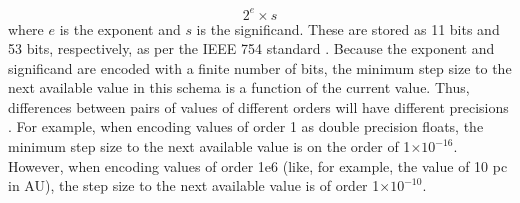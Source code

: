 \begin{equation}
2^e\times s
\end{equation}
where $e$ is the exponent and $s$ is the significand.  These are stored as 11 bits and 53 bits, respectively, as per the IEEE 754 standard \citep{IEEE2008}.  Because the exponent and significand are encoded with a finite number of bits, the minimum step size to the next available value in this schema is a function of the  current value.  Thus, differences between pairs of values of different orders will have different precisions \citep{moler2004numerical}.  For example, when encoding values of order 1 as double precision floats, the minimum step size to the next available value is on the order of 1$\times10^{-16}$.  However, when encoding values of order 1e6 (like, for example, the value of 10 pc in AU), the step size to the next available value is of order 1$\times10^{-10}$.


